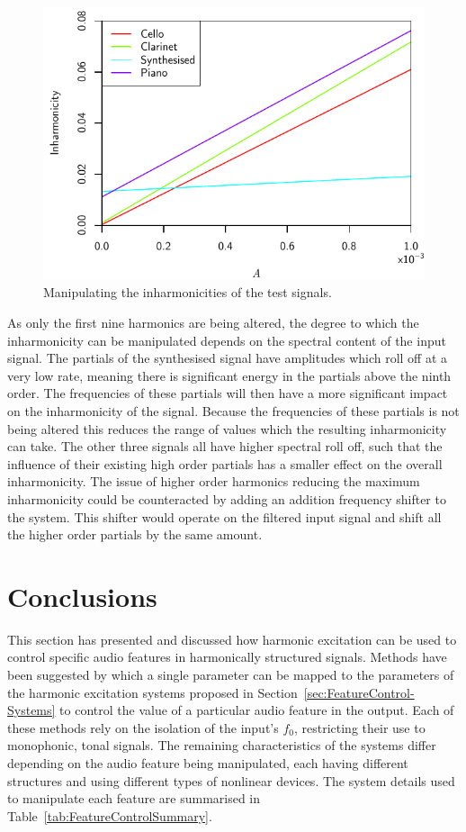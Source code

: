 		\begin{figure}[h!]
			\centering
			\includegraphics{chapter6/Images/MoveInharmonicities.pdf}
			\caption{Manipulating the inharmonicities of the test signals.}
			\label{fig:MoveInharmonicities}
		\end{figure}

		As only the first nine harmonics are being altered, the degree to which the inharmonicity can be
		manipulated depends on the spectral content of the input signal. The partials of the synthesised signal
		have amplitudes which roll off at a very low rate, meaning there is significant energy in the partials
		above the ninth order. The frequencies of these partials will then have a more significant impact on the
		inharmonicity of the signal. Because the frequencies of these partials is not being altered this reduces
		the range of values which the resulting inharmonicity can take. The other three signals all have higher
		spectral roll off, such that the influence of their existing high order partials has a smaller effect on
		the overall inharmonicity. The issue of higher order harmonics reducing the maximum inharmonicity could be
		counteracted by adding an addition frequency shifter to the system. This shifter would operate on the
		filtered input signal and shift all the higher order partials by the same amount.

\section{Conclusions}
\label{sec:FeatureControl-Conclusions}
	This section has presented and discussed how harmonic excitation can be used to control specific audio features in
	harmonically structured signals. Methods have been suggested by which a single parameter can be mapped to the
	parameters of the harmonic excitation systems proposed in Section~\ref{sec:FeatureControl-Systems} to control the
	value of a particular audio feature in the output. Each of these methods rely on the isolation of the
	input's $f_{0}$, restricting their use to monophonic, tonal signals. The remaining characteristics of the systems
	differ depending on the audio feature being manipulated, each having different structures and using different types
	of nonlinear devices. The system details used to manipulate each feature are summarised in
	Table~\ref{tab:FeatureControlSummary}.

